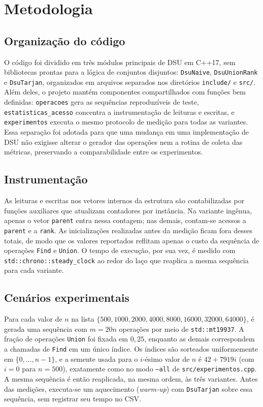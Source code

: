 \section{Metodologia}
\label{sec:metodologia}

\subsection{Organização do código}

O código foi dividido em três módulos principais de DSU em C++17, sem bibliotecas prontas para a lógica de conjuntos disjuntos: \texttt{DsuNaive}, \texttt{DsuUnionRank} e \texttt{DsuTarjan}, organizados em arquivos separados nos diretórios \texttt{include/} e \texttt{src/}. Além deles, o projeto mantém componentes compartilhados com funções bem definidas: \texttt{operacoes} gera as sequências reproduzíveis de teste, \texttt{estatisticas\_acesso} concentra a instrumentação de leituras e escritas, e \texttt{experimentos} executa o mesmo protocolo de medição para todas as variantes. Essa separação foi adotada para que uma mudança em uma implementação de DSU não exigisse alterar o gerador das operações nem a rotina de coleta das métricas, preservando a comparabilidade entre os experimentos.

\subsection{Instrumentação}

As leituras e escritas nos vetores internos da estrutura são contabilizadas por funções auxiliares que atualizam contadores por instância. Na variante ingênua, apenas o vetor \texttt{parent} entra nessa contagem; nas demais, contam-se acessos a \texttt{parent} e a \texttt{rank}. As inicializações realizadas antes da medição ficam fora desses totais, de modo que os valores reportados reflitam apenas o custo da sequência de operações \texttt{Find} e \texttt{Union}. O tempo de execução, por sua vez, é medido com \texttt{std::chrono::steady\_clock} ao redor do laço que reaplica a mesma sequência para cada variante.

\subsection{Cenários experimentais}

Para cada valor de $n$ na lista $\{500, 1000, 2000, 4000, 8000, 16000, 32000, 64000\}$, é gerada uma sequência com $m=20n$ operações por meio de \texttt{std::mt19937}. A fração de operações \texttt{Union} foi fixada em $0{,}25$, enquanto as demais correspondem a chamadas de \texttt{Find} em um único índice. Os índices são sorteados uniformemente em $\{0,\ldots,n-1\}$, e a semente usada para o $i$-ésimo valor de $n$ é $42 + 7919i$ (com $i=0$ para $n=500$), exatamente como no modo \texttt{--all} de \texttt{src/experimentos.cpp}. A mesma sequência é então reaplicada, na mesma ordem, às três variantes. Antes das medições, executa-se um aquecimento (\emph{warm-up}) com \texttt{DsuTarjan} sobre essa sequência, sem registrar seu tempo no CSV.

